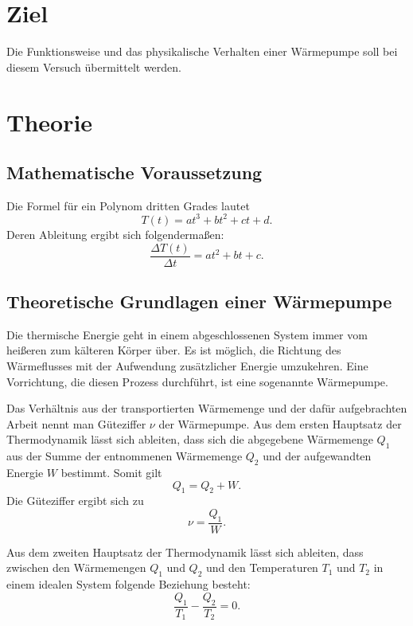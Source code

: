 \section{Ziel}
\label{sec:Ziel}

Die Funktionsweise und das physikalische Verhalten einer Wärmepumpe soll bei diesem 
Versuch übermittelt werden.

\section{Theorie}
\label{sec:Theorie}

\subsection{Mathematische Voraussetzung}
Die Formel für ein Polynom dritten Grades lautet 
\begin{equation}
    T(t)= at^3+bt^2+ct+d.
    \label{eqn:poly3}
\end{equation}
Deren Ableitung ergibt sich folgendermaßen: 
\begin{equation}
    \frac{\Delta T(t)}{\Delta t}=at^2+bt+c.
    \label{eqn:poly3ableitung}
\end{equation}
\subsection{Theoretische Grundlagen einer Wärmepumpe}
Die thermische Energie geht in einem abgeschlossenen System immer vom heißeren zum 
kälteren Körper über. Es ist möglich, die Richtung des Wärmeflusses mit der Aufwendung 
zusätzlicher Energie umzukehren. Eine Vorrichtung, die diesen Prozess durchführt, ist 
eine sogenannte Wärmepumpe. 

\noindent Das Verhältnis aus der transportierten Wärmemenge und der dafür aufgebrachten 
Arbeit nennt man Güteziffer $\nu$ der Wärmepumpe. Aus dem ersten Hauptsatz der 
Thermodynamik lässt sich ableiten, dass sich die abgegebene Wärmemenge $Q_1$ aus der 
Summe der entnommenen Wärmemenge $Q_2$ und der aufgewandten Energie $W$ bestimmt. 
Somit gilt
\begin{equation*}
    Q_1 = Q_2 + W.
\end{equation*} 
Die Güteziffer ergibt sich zu 
\begin{equation*}
    \nu = \frac{Q_1}{W}.
\end{equation*}

\noindent Aus dem zweiten Hauptsatz der Thermodynamik lässt sich ableiten, dass zwischen den Wärmemengen 
$Q_1$ und $Q_2$ und den Temperaturen $T_1$ und $T_2$ in einem idealen System folgende 
Beziehung besteht:
\begin{equation*}
    \frac{Q_1}{T_1} - \frac{Q_2}{T_2} = 0.
\end{equation*}

